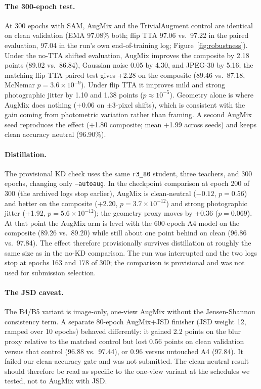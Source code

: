 \paragraph{The 300-epoch test.}
At 300 epochs with SAM, AugMix and the TrivialAugment control are identical on
clean validation (EMA 97.08\% both; flip TTA 97.06 vs.\ 97.22 in the paired evaluation, 97.04 in the run's own end-of-training log;
Figure~\ref{fig:robustness}). Under the no-TTA shifted evaluation, AugMix
improves the composite by 2.18 points (89.02 vs.\ 86.84), Gaussian noise 0.05 by
4.30, and JPEG-30 by 5.16; the matching flip-TTA paired test gives +2.28 on the
composite (89.46 vs.\ 87.18, McNemar $p=3.6\times10^{-9}$). Under flip TTA it
improves mild and strong photographic jitter by 1.10 and 1.38 points
($p\approx10^{-5}$). Geometry alone is where AugMix does nothing (+0.06 on
$\pm3$-pixel shifts), which is consistent with the gain coming from photometric
variation rather than framing. A second AugMix seed reproduces the effect (+1.80
composite; mean +1.99 across seeds) and keeps clean accuracy neutral (96.90\%).

\paragraph{Distillation.}
The provisional KD check uses the same \texttt{r3\_80} student, three teachers,
and 300 epochs, changing only \texttt{--autoaug}. In the checkpoint comparison at
epoch 200 of 300 (the archived logs stop earlier), AugMix is clean-neutral
($-0.12$, $p=0.56$) and better on the composite (+2.20,
$p=3.7\times10^{-12}$) and strong photographic jitter (+1.92,
$p=5.6\times10^{-12}$); the geometry proxy moves by +0.36 ($p=0.069$). At that
point the AugMix arm is level with the 600-epoch A4 model on the composite
(89.26 vs.\ 89.20) while still about one point behind on clean (96.86 vs.\
97.84). The effect therefore provisionally survives distillation at roughly the
same size as in the no-KD comparison. The run was interrupted and the two logs
stop at epochs 163 and 178 of 300; the comparison is provisional and was not used
for submission selection.

\paragraph{The JSD caveat.}
The B4/B5 variant is image-only, one-view AugMix without the Jensen-Shannon
consistency term. A separate 80-epoch AugMix+JSD finisher (JSD weight 12, ramped
over 10 epochs) behaved differently: it gained 2.2 points on the blur proxy
relative to the matched control but lost 0.56 points on clean validation versus
that control (96.88 vs.\ 97.44), or 0.96 versus untouched A4 (97.84). It failed our
clean-accuracy gate and was not submitted. The clean-neutral result should
therefore be read as specific to the one-view variant at the schedules we tested,
not to AugMix with JSD.

